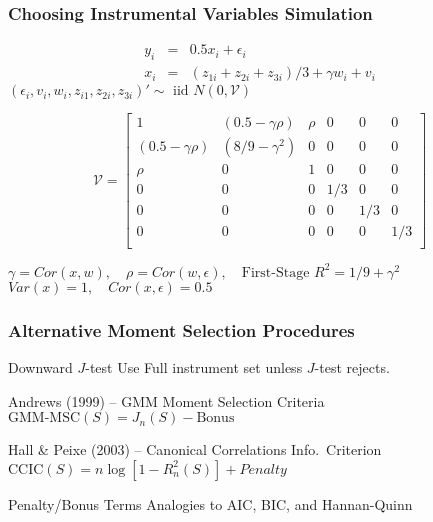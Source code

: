 \begin{frame}[t]
	\frametitle{Choosing Instrumental Variables Simulation}

  \vspace{-3em}

\small
\begin{eqnarray*}
		y_i &=& 0.5 x_i + \epsilon_i\\ 
		x_i &=& (z_{1i} + z_{2i} + z_{3i}) /3 + \gamma w_i + v_i 
	\end{eqnarray*}
 $(\epsilon_i, v_i, w_i, z_{i1}, z_{2i}, z_{3i})' \sim \mbox{ iid  } N(0,\mathcal{V})$ 
 
			$$\mathcal{V} = \left[  
				\begin{array}{cccccc}
				1 & (0.5 - \gamma \rho) & \rho & 0 & 0 & 0\\
				(0.5 - \gamma \rho) & (8/9 - \gamma^2) & 0 & 0 & 0 & 0 \\
				\rho & 0 & 1 & 0 & 0 & 0\\
				0 & 0 & 0 & 1/3 & 0 & 0\\
				0 & 0 & 0 & 0 & 1/3 & 0\\
				0 & 0 & 0 & 0 & 0 & 1/3\\
				\end{array}
		\right]$$

		\vspace{0.5em}
\begin{center}
\alert{$\gamma = Cor(x,w),\quad \rho = Cor(w, \epsilon), \quad
 \mbox{First-Stage } R^2=1/9 + \gamma^2$}
	$Var(x)=1, \quad Cor(x, \epsilon)=0.5$
\end{center}
 
	
\end{frame}
\begin{frame}
\footnotesize
\begin{figure}
	\centering
	
\end{figure}
\end{frame}

\begin{frame}

	\frametitle{Alternative Moment Selection Procedures}

	\begin{block}{Downward $J$-test}
	Use Full instrument set unless $J$-test rejects.
	\end{block}

	\begin{block}{Andrews (1999) -- GMM Moment Selection Criteria}
		$\mbox{GMM-MSC}(S)=J_{n}(S) - \mbox{Bonus}$		
	\end{block}
	
	\begin{block}{Hall \& Peixe (2003) -- Canonical Correlations Info.\ Criterion}
	$\mbox{CCIC}(S) = n \log\left[1 - R_n^2(S) \right] + Penalty$
	\end{block}
	
	\begin{block}{Penalty/Bonus Terms}
		Analogies to AIC, BIC, and Hannan-Quinn
	\end{block}
\end{frame}

